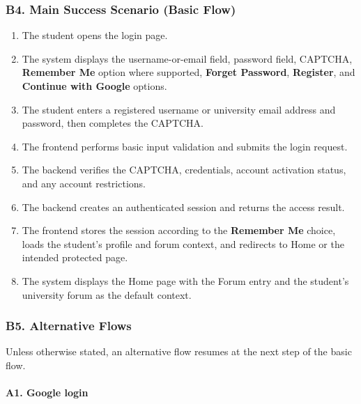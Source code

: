 \documentclass[12pt]{article}
\begin{document}
\hypertarget{sec:b4-main-success-scenario-basic-flow}{}
\subsubsection*{B4. Main Success Scenario (Basic Flow)}
\par\medskip

\begin{enumerate}
\item The student opens the login page.
\item The system displays the username-or-email field, password field, CAPTCHA, \textbf{Remember Me} option where supported, \textbf{Forget Password}, \textbf{Register}, and \textbf{Continue with Google} options.
\item The student enters a registered username or university email address and password, then completes the CAPTCHA.
\item The frontend performs basic input validation and submits the login request.
\item The backend verifies the CAPTCHA, credentials, account activation status, and any account restrictions.
\item The backend creates an authenticated session and returns the access result.
\item The frontend stores the session according to the \textbf{Remember Me} choice, loads the student's profile and forum context, and redirects to Home or the intended protected page.
\item The system displays the Home page with the Forum entry and the student's university forum as the default context.
\end{enumerate}
\par\medskip

\hypertarget{sec:b5-alternative-flows}{}
\subsubsection*{B5. Alternative Flows}
\par\medskip

Unless otherwise stated, an alternative flow resumes at the next step of the basic flow.
\par\medskip

\hypertarget{sec:a1-google-login}{}
\paragraph*{A1. Google login}
\par\medskip
\end{document}
